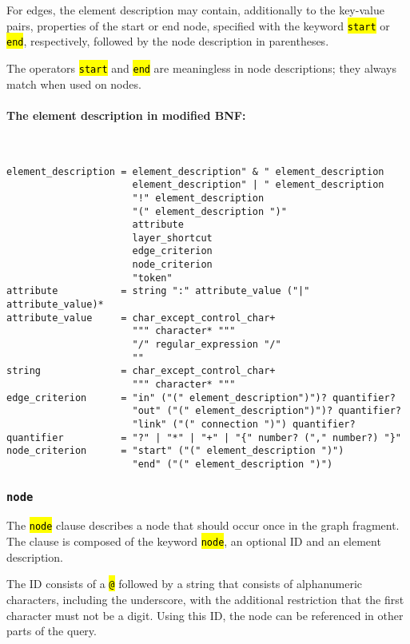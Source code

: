 \documentclass[12pt]{scrartcl}
\newcommand{\code}[1]{\hl{\texttt{#1}}}
\begin{document}
For edges, the element description may contain, additionally to the key-value pairs, properties of the start or end node, specified with the keyword \code{start} or \code{end}, respectively, followed by the node description in parentheses.

The operators \code{start} and \code{end} are meaningless in node descriptions; they always match when used on nodes.

\paragraph*{The element description in modified BNF:}
~
\begin{lstlisting}
element_description = element_description" & " element_description
                      element_description" | " element_description
                      "!" element_description
                      "(" element_description ")"
                      attribute
                      layer_shortcut
                      edge_criterion
                      node_criterion
                      "token"
attribute           = string ":" attribute_value ("|" attribute_value)*
attribute_value     = char_except_control_char+
                      """ character* """
                      "/" regular_expression "/"
                      ""
string              = char_except_control_char+
                      """ character* """
edge_criterion      = "in" ("(" element_description")")? quantifier?
                      "out" ("(" element_description")")? quantifier?
                      "link" ("(" connection ")") quantifier?
quantifier          = "?" | "*" | "+" | "{" number? ("," number?) "}"
node_criterion      = "start" ("(" element_description ")")
                      "end" ("(" element_description ")")
\end{lstlisting}


\subsubsection{\texttt{node}}\label{node}

The \code{node} clause describes a node that should occur once in the graph fragment.
The clause is composed of the keyword \code{node}, an optional ID and an element description.

The ID consists of a \code{@} followed by a string that consists of alphanumeric characters, including the underscore, with the additional restriction that the first character must not be a digit.
Using this ID, the node can be referenced in other parts of the query.
\end{document}
